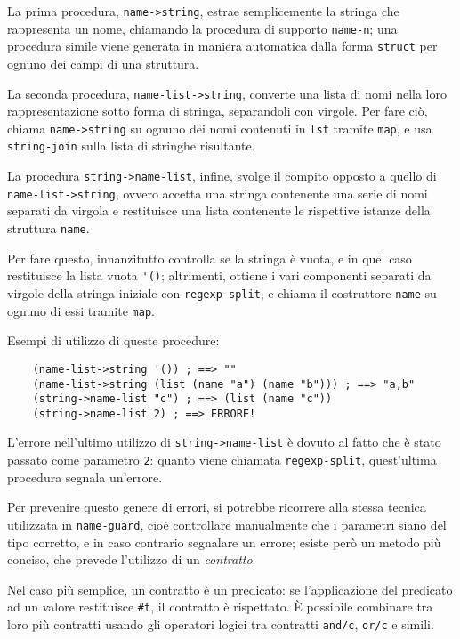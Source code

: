 La prima procedura, \lstinline{name->string}, estrae semplicemente la
stringa che rappresenta un nome, chiamando la procedura di supporto
\lstinline{name-n}; una procedura simile viene generata in maniera
automatica dalla forma \lstinline{struct} per ognuno dei campi di una
struttura.

La seconda procedura, \lstinline{name-list->string}, converte una lista
di nomi nella loro rappresentazione sotto forma di stringa, separandoli
con virgole. Per fare ci\`o, chiama \lstinline{name->string} su ognuno dei
nomi contenuti in \lstinline{lst} tramite \lstinline{map}, e usa
\lstinline{string-join} sulla lista di stringhe risultante.

La procedura \lstinline{string->name-list}, infine, svolge il compito
opposto a quello di \lstinline{name-list->string}, ovvero accetta una
stringa contenente una serie di nomi separati da virgola e restituisce una
lista contenente le rispettive istanze della struttura \lstinline{name}.

Per fare questo, innanzitutto controlla se la stringa \`e vuota, e in quel
caso restituisce la lista vuota \lstinline{'()}; altrimenti, ottiene i vari
componenti separati da virgole della stringa iniziale con
\lstinline{regexp-split}, e chiama il costruttore \lstinline{name} su
ognuno di essi tramite \lstinline{map}.

Esempi di utilizzo di queste procedure:

\begin{lstlisting}
    (name-list->string '()) ; ==> ""
    (name-list->string (list (name "a") (name "b"))) ; ==> "a,b"
    (string->name-list "c") ; ==> (list (name "c"))
    (string->name-list 2) ; ==> ERRORE!
\end{lstlisting}

L'errore nell'ultimo utilizzo di \lstinline{string->name-list} \`e dovuto
al fatto che \`e stato passato come parametro \lstinline{2}: quanto viene
chiamata \lstinline{regexp-split}, quest'ultima procedura segnala un'errore.

Per prevenire questo genere di errori, si potrebbe ricorrere alla stessa
tecnica utilizzata in \lstinline{name-guard}, cio\`e controllare manualmente
che i parametri siano del tipo corretto, e in caso contrario segnalare un
errore; esiste per\`o un metodo pi\`u conciso, che prevede l'utilizzo di
un \emph{contratto}.

Nel caso pi\`u semplice, un contratto \`e un predicato: se l'applicazione
del predicato ad un valore restituisce \lstinline{#t}, il contratto \`e
rispettato. \`E possibile combinare tra loro pi\`u contratti usando gli
operatori logici tra contratti \lstinline{and/c}, \lstinline{or/c} e simili.


